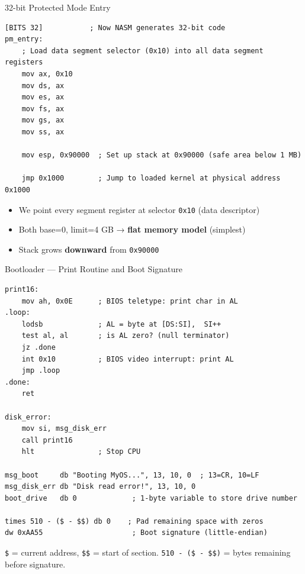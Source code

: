 \documentclass[aspectratio=169]{beamer}
\begin{document}
\begin{frame}[fragile]{32-bit Protected Mode Entry}
  \begin{lstlisting}[style=asm]
[BITS 32]           ; Now NASM generates 32-bit code
pm_entry:
    ; Load data segment selector (0x10) into all data segment registers
    mov ax, 0x10
    mov ds, ax
    mov es, ax
    mov fs, ax
    mov gs, ax
    mov ss, ax

    mov esp, 0x90000  ; Set up stack at 0x90000 (safe area below 1 MB)

    jmp 0x1000        ; Jump to loaded kernel at physical address 0x1000
  \end{lstlisting}
  \vspace{4pt}
  \begin{itemize}
    \item We point every segment register at selector \texttt{0x10} (data descriptor)
    \item Both base=0, limit=4 GB → \textbf{flat memory model} (simplest)
    \item Stack grows \textbf{downward} from \texttt{0x90000}
  \end{itemize}
\end{frame}

\begin{frame}[fragile]{Bootloader --- Print Routine and Boot Signature}
  \begin{lstlisting}[style=asm]
print16:
    mov ah, 0x0E      ; BIOS teletype: print char in AL
.loop:
    lodsb             ; AL = byte at [DS:SI],  SI++
    test al, al       ; is AL zero? (null terminator)
    jz .done
    int 0x10          ; BIOS video interrupt: print AL
    jmp .loop
.done:
    ret

disk_error:
    mov si, msg_disk_err
    call print16
    hlt               ; Stop CPU

msg_boot     db "Booting MyOS...", 13, 10, 0  ; 13=CR, 10=LF
msg_disk_err db "Disk read error!", 13, 10, 0
boot_drive   db 0             ; 1-byte variable to store drive number

times 510 - ($ - $$) db 0    ; Pad remaining space with zeros
dw 0xAA55                     ; Boot signature (little-endian)
  \end{lstlisting}
  \vspace{2pt}
  \small \texttt{\$} = current address, \texttt{\$\$} = start of section. \texttt{510 - (\$ - \$\$)} = bytes remaining before signature.
\end{frame}

\end{document}
